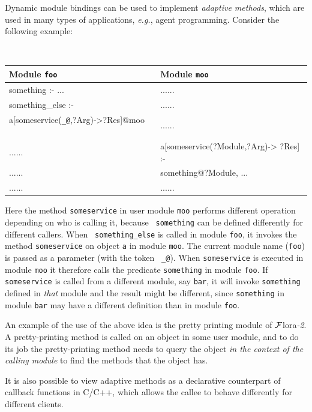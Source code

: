 \documentclass[11pt]{article}
\makeatletter
\newcommand{\thismodule}{{\tt \_@}\xspace}
\newcommand{\FLORA}{{\mbox{\sc ${\cal F}${lora}\rm\emph{-2}}}\xspace}
\makeatother
\begin{document}
Dynamic module bindings can be used to implement \emph{adaptive methods},
which are used in  many types of applications, {\it e.g.}, agent
programming. Consider the following example:
  \begin{center}
    {\tt
    \begin{tabular}{l l}
      Module {\tt foo}  & Module {\tt moo} \\
      \hline
      something :- ... & ......\\
      something\_else :- & ......\\
      \hspace*{1.5cm}a[someservice(\thismodule,?Arg)->?Res]@moo ~~& ......\\
      ...... & a[someservice(?Module,?Arg)-> ?Res] :- \\
      ...... & \hspace*{2.2cm} something@?Module, ...\\
      ...... & ......
      
    \end{tabular}
    }
  \end{center}
  
  Here the method {\tt someservice} in user module {\tt moo} performs
  different operation depending on who is calling it, because {\tt
    something} can be defined differently for different callers.  When {\tt
    something\_else} is called in module {\tt foo}, it invokes the method
  {\tt someservice} on object {\tt a} in module {\tt moo}. The current
  module name ({\tt foo}) is passed as a parameter (with the token {\tt
  \_@}). When {\tt someservice}
  is executed in module {\tt moo} it therefore calls the predicate {\tt something} in
  module {\tt foo}.
  If {\tt someservice} is called from a different module, say {\tt bar},  it will invoke
  {\tt something} defined in \emph{that} module and the result might be
  different, since {\tt something} in module {\tt bar} may have a different
  definition than in module {\tt foo}.      
  
  An example of the use of the above idea is the pretty printing module of
  \FLORA.
  A pretty-printing method is called on an object in some
  user module, and to do its job the pretty-printing method needs to query
  the object \emph{in the context of the calling module} to find the
  methods that the object has.

It is also possible to view adaptive methods as a declarative counterpart
of callback functions in C/C++, which allows the callee to behave
differently for different clients.
\end{document}

